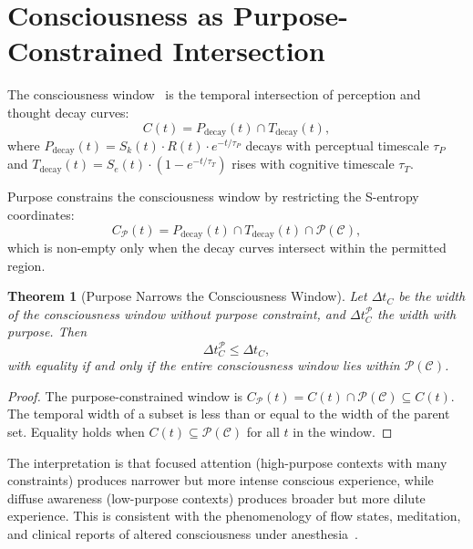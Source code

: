 \documentclass[aps,prd,twocolumn,superscriptaddress,floatfix,nofootinbib]{revtex4-2}
\newtheorem{theorem}{Theorem}[section]
\theoremstyle{remark}
\newcommand{\Sk}{S_k}
\newcommand{\Se}{S_e}
\newcommand{\Pdecay}{P_{\mathrm{decay}}}
\newcommand{\Tdecay}{T_{\mathrm{decay}}}
\newcommand{\Purpose}{\mathcal{P}}
\newcommand{\Context}{\mathcal{C}}
\newcommand{\tauP}{\tau_P}
\newcommand{\tauT}{\tau_T}
\begin{document}
\section{Consciousness as Purpose-Constrained Intersection}
\label{sec:consciousness}

The consciousness window~\cite{sachikonye2026regime,sachikonye2026lagrangian} is the temporal intersection of perception and thought decay curves:
\begin{equation}
C(t) = \Pdecay(t) \cap \Tdecay(t),
\label{eq:consciousness}
\end{equation}
where $\Pdecay(t) = \Sk(t) \cdot R(t) \cdot e^{-t/\tauP}$ decays with perceptual timescale $\tauP$ and $\Tdecay(t) = \Se(t) \cdot (1 - e^{-t/\tauT})$ rises with cognitive timescale $\tauT$.

Purpose constrains the consciousness window by restricting the S-entropy coordinates:
\begin{equation}
C_\Purpose(t) = \Pdecay(t) \cap \Tdecay(t) \cap \Purpose(\Context),
\end{equation}
which is non-empty only when the decay curves intersect within the permitted region.

\begin{theorem}[Purpose Narrows the Consciousness Window]
\label{thm:consciousness_purpose}
Let $\Delta t_C$ be the width of the consciousness window without purpose constraint, and $\Delta t_C^\Purpose$ the width with purpose.
Then
\begin{equation}
\Delta t_C^\Purpose \leq \Delta t_C,
\end{equation}
with equality if and only if the entire consciousness window lies within $\Purpose(\Context)$.
\end{theorem}

\begin{proof}
The purpose-constrained window is $C_\Purpose(t) = C(t) \cap \Purpose(\Context) \subseteq C(t)$.
The temporal width of a subset is less than or equal to the width of the parent set.
Equality holds when $C(t) \subseteq \Purpose(\Context)$ for all $t$ in the window.
\end{proof}

The interpretation is that focused attention (high-purpose contexts with many constraints) produces narrower but more intense conscious experience, while diffuse awareness (low-purpose contexts) produces broader but more dilute experience.
This is consistent with the phenomenology of flow states, meditation, and clinical reports of altered consciousness under anesthesia~\cite{mashour2014top,dehaene2014consciousness}.
\end{document}
